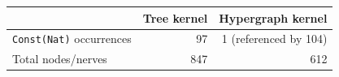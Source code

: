 \begin{tabular}{@{}lrr@{}}
\toprule
& Tree kernel & Hypergraph kernel \\
\midrule
\texttt{Const(Nat)} occurrences & 97 & 1 (referenced by 104) \\
Total nodes/nerves & 847 & 612 \\
\bottomrule
\end{tabular}
